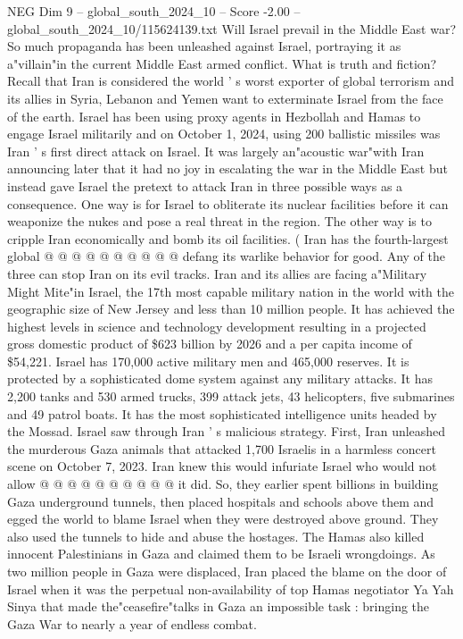 \begin{textsample}{NEG Dim 9 – global\_south\_2024\_10 – Score -2.00 – global\_south\_2024\_10/115624139.txt}  \label{ex:f9_neg_368}
Will Israel prevail in the Middle East war?
So much propaganda has been unleashed against Israel, portraying it as a"villain"in the current Middle East armed conflict.
What is truth and fiction?
Recall that Iran is considered the world ' s worst exporter of global terrorism and its allies in Syria, Lebanon and Yemen want to exterminate Israel from the face of the earth.
Israel has been using proxy agents in Hezbollah and Hamas to engage Israel militarily and on October 1, 2024, using 200 ballistic missiles was Iran ' s first direct attack on Israel.
It was largely an"acoustic war"with Iran announcing later that it had no joy in escalating the war in the Middle East but instead gave Israel the pretext to attack Iran in three possible ways as a consequence.
One way is for Israel to obliterate its nuclear facilities before it can weaponize the nukes and pose a real threat in the region.
The other way is to cripple Iran economically and bomb its oil facilities. ( Iran has the fourth-largest global @ @ @ @ @ @ @ @ @ @ defang its warlike behavior for good.
Any of the three can stop Iran on its evil tracks.
Iran and its allies are facing a"Military Might Mite"in Israel, the 17th most capable military nation in the world with the geographic size of New Jersey and less than 10 million people.
It has achieved the highest levels in science and technology development resulting in a projected gross domestic product of \$623 billion by 2026 and a per capita income of \$54,221.
Israel has 170,000 active military men and 465,000 reserves.
It is protected by a sophisticated dome system against any military attacks.
It has 2,200 tanks and 530 armed trucks, 399 attack jets, 43 helicopters, five submarines and 49 patrol boats.
It has the most sophisticated intelligence units headed by the Mossad.
Israel saw through Iran ' s malicious strategy.
First, Iran unleashed the murderous Gaza animals that attacked 1,700 Israelis in a harmless concert scene on October 7, 2023.
Iran knew this would infuriate Israel who would not allow @ @ @ @ @ @ @ @ @ @ it did.
So, they earlier spent billions in building Gaza underground tunnels, then placed hospitals and schools above them and egged the world to blame Israel when they were destroyed above ground.
They also used the tunnels to hide and abuse the hostages.
The Hamas also killed innocent Palestinians in Gaza and claimed them to be Israeli wrongdoings.
As two million people in Gaza were displaced, Iran placed the blame on the door of Israel when it was the perpetual non-availability of top Hamas negotiator Ya Yah Sinya that made the"ceasefire"talks in Gaza an impossible task : bringing the Gaza War to nearly a year of endless combat.

\end{textsample}
